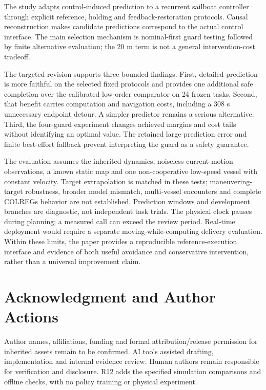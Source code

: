 \documentclass[conference]{IEEEtran}
\begin{document}
The study adapts control-induced prediction to a recurrent sailboat controller through explicit reference, holding and feedback-restoration protocols. Causal reconstruction makes candidate predictions correspond to the actual control interface. The main selection mechanism is nominal-first guard testing followed by finite alternative evaluation; the 20 m term is not a general intervention-cost tradeoff.

The targeted revision supports three bounded findings. First, detailed prediction is more faithful on the selected fixed protocols and provides one additional safe completion over the calibrated low-order comparator on 24 frozen tasks. Second, that benefit carries computation and navigation costs, including a 308 s unnecessary endpoint detour. A simpler predictor remains a serious alternative. Third, the four-guard experiment changes achieved margins and cost tails without identifying an optimal value. The retained large prediction error and finite best-effort fallback prevent interpreting the guard as a safety guarantee.

The evaluation assumes the inherited dynamics, noiseless current motion observations, a known static map and one non-cooperative low-speed vessel with constant velocity. Target extrapolation is matched in these tests; maneuvering-target robustness, broader model mismatch, multi-vessel encounters and complete COLREGs behavior are not established. Prediction windows and development branches are diagnostic, not independent task trials. The physical clock pauses during planning; a measured call can exceed the review period. Real-time deployment would require a separate moving-while-computing delivery evaluation. Within these limits, the paper provides a reproducible reference-execution interface and evidence of both useful avoidance and conservative intervention, rather than a universal improvement claim.

\section*{Acknowledgment and Author Actions}

Author names, affiliations, funding and formal attribution/release permission for inherited assets remain to be confirmed. AI tools assisted drafting, implementation and internal evidence review. Human authors remain responsible for verification and disclosure. R12 adds the specified simulation comparisons and offline checks, with no policy training or physical experiment.
\end{document}
